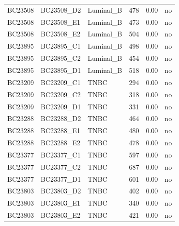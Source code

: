 \begin{longtable}{lllccc}
BC23508 & BC23508\_D2 & Luminal\_B & 478 & 0.00 & no \\
BC23508 & BC23508\_E1 & Luminal\_B & 473 & 0.00 & no \\
BC23508 & BC23508\_E2 & Luminal\_B & 504 & 0.00 & no \\
BC23895 & BC23895\_C1 & Luminal\_B & 498 & 0.00 & no \\
BC23895 & BC23895\_C2 & Luminal\_B & 454 & 0.00 & no \\
BC23895 & BC23895\_D1 & Luminal\_B & 518 & 0.00 & no \\
BC23209 & BC23209\_C1 & TNBC & 294 & 0.00 & no \\
BC23209 & BC23209\_C2 & TNBC & 318 & 0.00 & no \\
BC23209 & BC23209\_D1 & TNBC & 331 & 0.00 & no \\
BC23288 & BC23288\_D2 & TNBC & 464 & 0.00 & no \\
BC23288 & BC23288\_E1 & TNBC & 480 & 0.00 & no \\
BC23288 & BC23288\_E2 & TNBC & 478 & 0.00 & no \\
BC23377 & BC23377\_C1 & TNBC & 597 & 0.00 & no \\
BC23377 & BC23377\_C2 & TNBC & 687 & 0.00 & no \\
BC23377 & BC23377\_D1 & TNBC & 601 & 0.00 & no \\
BC23803 & BC23803\_D2 & TNBC & 402 & 0.00 & no \\
BC23803 & BC23803\_E1 & TNBC & 340 & 0.00 & no \\
BC23803 & BC23803\_E2 & TNBC & 421 & 0.00 & no \\
\bottomrule
\end{longtable}
